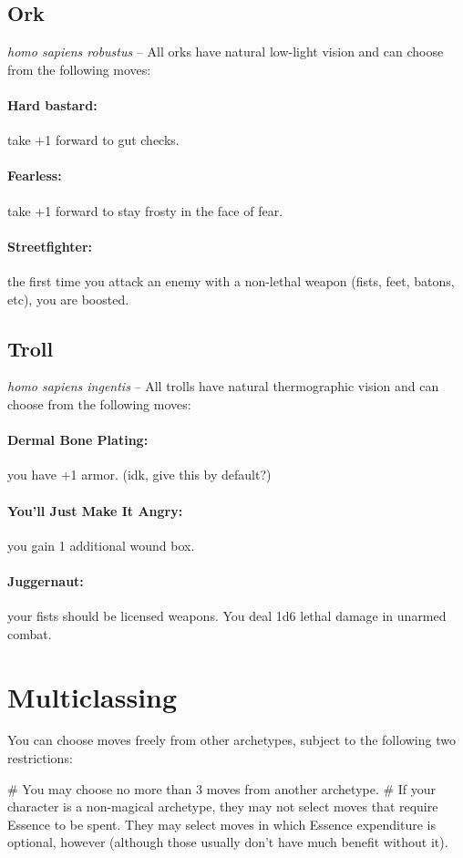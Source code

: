 \subsection*{Ork}
\textit{homo sapiens robustus} -- All orks have natural low-light vision and can choose from the following moves:
\paragraph{Hard bastard:} take +1 forward to gut checks.
\paragraph{Fearless:} take +1 forward to stay frosty in the face of fear.
\paragraph{Streetfighter:} the first time you attack an enemy with a non-lethal weapon (fists, feet, batons, etc), you are boosted.

\subsection*{Troll}
\textit{homo sapiens ingentis} -- All trolls have natural thermographic vision and can choose from the following moves:
\paragraph{Dermal Bone Plating:} you have +1 armor. (idk, give this by default?)
\paragraph{You’ll Just Make It Angry:} you gain 1 additional wound box.
\paragraph{Juggernaut:} your fists should be licensed weapons. You deal 1d6 lethal damage in unarmed combat.


\section{Multiclassing}

You can choose moves freely from other archetypes, subject to the following two restrictions:

\begin{easylist}
    # You may choose no more than 3 moves from another archetype.
    # If your character is a non-magical archetype, they may not select moves that require Essence to be spent. They may select moves in which Essence expenditure is optional, however (although those usually don’t have much benefit without it).
\end{easylist}
